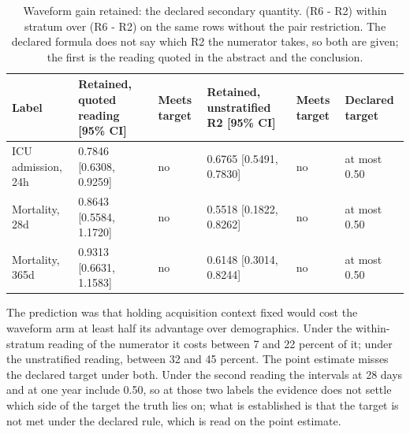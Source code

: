 \begin{table}[t]
\centering
\small
\caption{Waveform gain retained: the declared secondary quantity. (R6 - R2) within stratum over (R6 - R2) on the same rows without the pair restriction. The declared formula does not say which R2 the numerator takes, so both are given; the first is the reading quoted in the abstract and the conclusion.}
\label{tab:retained}
\begin{tabular}{llllll}
\toprule
Label & Retained, quoted reading [95\% CI] & Meets target & Retained, unstratified R2 [95\% CI] & Meets target & Declared target \\
\midrule
ICU admission, 24h & 0.7846 [0.6308, 0.9259] & no & 0.6765 [0.5491, 0.7830] & no & at most 0.50 \\
Mortality, 28d & 0.8643 [0.5584, 1.1720] & no & 0.5518 [0.1822, 0.8262] & no & at most 0.50 \\
Mortality, 365d & 0.9313 [0.6631, 1.1583] & no & 0.6148 [0.3014, 0.8244] & no & at most 0.50 \\
\bottomrule
\end{tabular}
\par\footnotesize The prediction was that holding acquisition context fixed would cost the waveform arm at least half its advantage over demographics. Under the within-stratum reading of the numerator it costs between 7 and 22 percent of it; under the unstratified reading, between 32 and 45 percent. The point estimate misses the declared target under both. Under the second reading the intervals at 28 days and at one year include 0.50, so at those two labels the evidence does not settle which side of the target the truth lies on; what is established is that the target is not met under the declared rule, which is read on the point estimate.
\end{table}

